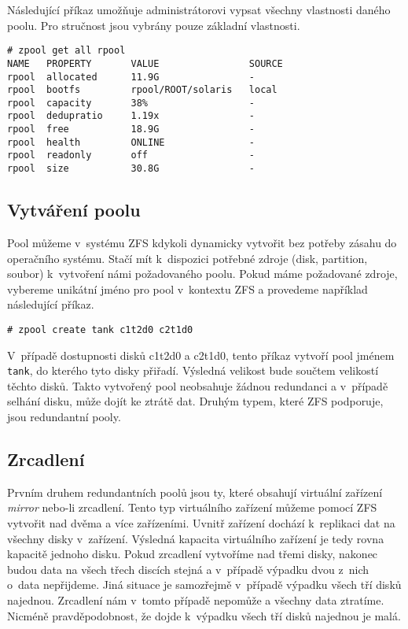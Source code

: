 Následující příkaz umožňuje administrátorovi vypsat všechny vlastnosti daného poolu. Pro stručnost jsou vybrány pouze základní vlastnosti.
\begin{verbatim}
# zpool get all rpool
NAME   PROPERTY       VALUE                SOURCE
rpool  allocated      11.9G                -
rpool  bootfs         rpool/ROOT/solaris   local
rpool  capacity       38%                  -
rpool  dedupratio     1.19x                -
rpool  free           18.9G                -
rpool  health         ONLINE               -
rpool  readonly       off                  -
rpool  size           30.8G                -
\end{verbatim}

\subsection{Vytváření poolu}
Pool můžeme v~systému ZFS kdykoli dynamicky vytvořit bez potřeby zásahu do operačního systému. Stačí mít k~dispozici potřebné zdroje (disk, partition, soubor) k~vytvoření námi požadovaného poolu. Pokud máme požadované zdroje, vybereme unikátní jméno pro pool v~kontextu ZFS a provedeme například následující příkaz.
\begin{verbatim}
# zpool create tank c1t2d0 c2t1d0
\end{verbatim}
V~případě dostupnosti disků c1t2d0 a c2t1d0, tento příkaz vytvoří pool jménem \verb|tank|, do kterého tyto disky přiřadí. Výsledná velikost bude součtem velikostí těchto disků. Takto vytvořený pool neobsahuje žádnou redundanci a v~případě selhání disku, může dojít ke ztrátě dat. Druhým typem, které ZFS podporuje, jsou redundantní pooly.
\subsection{Zrcadlení}
Prvním druhem redundantních poolů jsou ty, které obsahují virtuální zařízení \emph{mirror} nebo-li zrcadlení. Tento typ virtuálního zařízení můžeme pomocí ZFS vytvořit nad dvěma a více zařízeními. Uvnitř zařízení dochází k~replikaci dat na všechny disky v~zařízení. Výsledná kapacita virtuálního zařízení je tedy rovna kapacitě jednoho disku. Pokud zrcadlení vytvoříme nad třemi disky, nakonec budou data na všech třech discích stejná a v~případě výpadku dvou z~nich o~data nepřijdeme. Jiná situace je samozřejmě v~případě výpadku všech tří disků najednou. Zrcadlení nám v~tomto případě nepomůže a všechny data ztratíme. Nicméně pravděpodobnost, že dojde k~výpadku všech tří disků najednou je malá.

